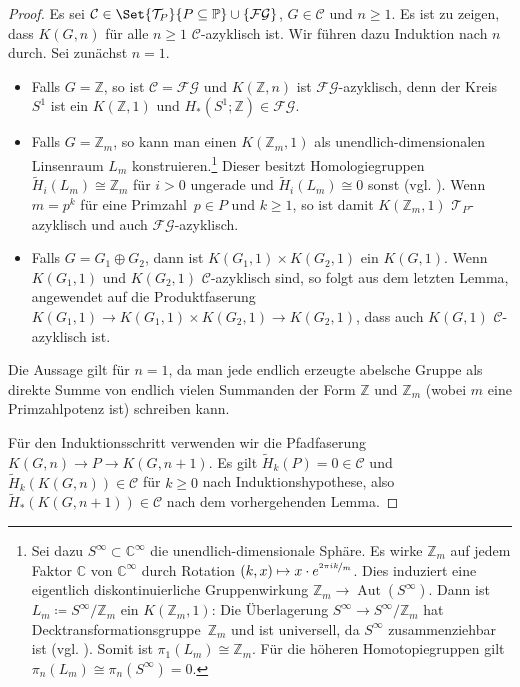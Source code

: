 \documentclass[11pt, a4paper, german]{article}
\theoremstyle{definition}
\theoremstyle{remark}
\newcommand{\Z}{\mathbb{Z}} %
\newcommand{\C}{\mathbb{C}} %
\newcommand{\SC}{\mathcal{C}} %
\newcommand{\FG}{\mathcal{FG}} %
\newcommand{\T}{\mathcal{T}} %
\DeclareMathOperator{\Aut}{Aut} %
\newcommand{\Primes}{\mathbb{P}} %
\begin{document}
\begin{proof}
  Es sei $\SC \in \Set{\T_P}{P \subseteq \Primes} \cup \{ \FG \}$, $G \in \SC$ und $n \geq 1$.
  Es ist zu zeigen, dass $K(G, n)$ für alle $n \geq 1$ $\SC$-azyklisch ist.
  Wir führen dazu Induktion nach $n$ durch.
  Sei zunächst $n = 1$.
  \begin{itemize}
    \item Falls $G = \Z$, so ist $\SC = \FG$ und $K(\Z, n)$ ist $\FG$-azyklisch, denn der Kreis $S^1$ ist ein $K(\Z, 1)$ und $H_*(S^1; \Z) \in \FG$.
    \item Falls $G = \Z_m$, so kann man einen $K(\Z_m, 1)$ als unendlich-dimensionalen Linsenraum $L_m$ konstruieren.\footnote{
      Sei dazu $S^\infty \subset \C^\infty$ die unendlich-dimensionale Sphäre.
      Es wirke $\Z_m$ auf jedem Faktor $\C$ von $\C^\infty$ durch Rotation $(k, x) \mapsto x \cdot e^{\nicefrac{2 \pi i k}{m}}$. Dies induziert eine eigentlich diskontinuierliche Gruppenwirkung $\Z_m \to \Aut(S^\infty)$.
      Dann ist $L_m \coloneqq S^\infty / \Z_m$ ein $K(\Z_m, 1)$: Die Überlagerung $S^\infty \to S^\infty / \Z_m$ hat Decktransformationsgruppe~$\Z_m$ und ist universell, da $S^\infty$ zusammenziehbar ist (vgl. \cite[Bspe 1B.3, 1B.4]{hatcher:at}). Somit ist $\pi_1(L_m) \cong \Z_m$.
      Für die höheren Homotopiegruppen gilt $\pi_n(L_m) \cong \pi_n(S^\infty) = 0$.
    }
    Dieser besitzt Homologiegruppen $\tilde{H}_i(L_m) \cong \Z_m$ für $i > 0$ ungerade und $\tilde{H}_i(L_m) \cong 0$ sonst (vgl. \cite[Bsp 2.43]{hatcher:at}).
    Wenn $m = p^k$ für eine Primzahl~$p \in P$ und $k \geq 1$, so ist damit $K(\Z_m, 1)$ $\T_P$-azyklisch und auch $\FG$-azyklisch.
    \item Falls $G = G_1 \oplus G_2$, dann ist $K(G_1, 1) \times K(G_2, 1)$ ein $K(G, 1)$.
    Wenn $K(G_1, 1)$ und $K(G_2, 1)$ $\SC$-azyklisch sind, so folgt aus dem letzten Lemma, angewendet auf die Produktfaserung $K(G_1, 1) \to K(G_1, 1) \times K(G_2, 1) \to K(G_2, 1)$, dass auch $K(G, 1)$ $\SC$-azyklisch ist.
  \end{itemize}
  Die Aussage gilt für $n=1$, da man jede endlich erzeugte abelsche Gruppe als direkte Summe von endlich vielen Summanden der Form $\Z$ und $\Z_m$ (wobei $m$ eine Primzahlpotenz ist) schreiben kann.

  Für den Induktionsschritt verwenden wir die Pfadfaserung $K(G, n) \to P \to K(G, n{+}1)$.
  Es gilt $\tilde{H}_k(P) = 0 \in \SC$ und $\tilde{H}_k(K(G, n)) \in \SC$ für $k \geq 0$ nach Induktionshypothese, also $\widetilde{H}_*(K(G, n{+}1)) \in \SC$ nach dem vorhergehenden Lemma.
\end{proof}
\end{document}
